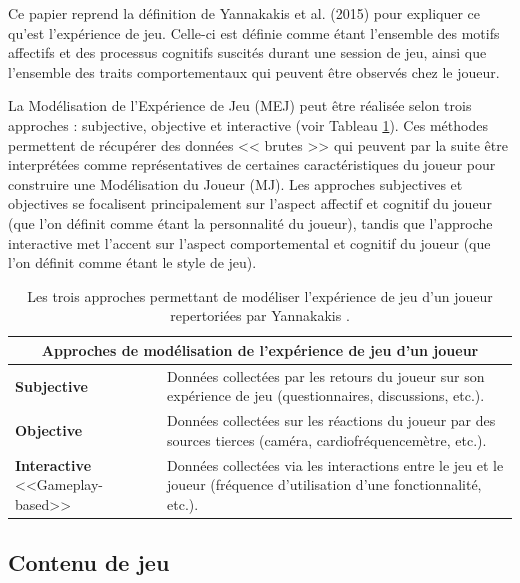 \documentclass[a4paper,11pt]{article}
\begin{document}
        Ce papier reprend la définition de Yannakakis et al. (2015) \cite{Yannakakis} pour expliquer ce qu'est l'expérience de jeu.
        Celle-ci est définie comme étant l'ensemble des motifs affectifs et des processus cognitifs suscités durant une session de jeu, ainsi que l'ensemble des traits comportementaux qui peuvent être observés chez le joueur.

        La Modélisation de l'Expérience de Jeu (MEJ) peut être réalisée selon trois approches : subjective, objective et interactive (voir Tableau \ref{table:pems}).
        Ces méthodes permettent de récupérer des données << brutes >> qui peuvent par la suite être interprétées comme représentatives de certaines caractéristiques du joueur pour construire une Modélisation du Joueur (MJ).
        Les approches subjectives et objectives se focalisent principalement sur l'aspect affectif et cognitif du joueur (que l'on définit comme étant la personnalité du joueur), tandis que l'approche interactive met l'accent sur l'aspect comportemental et cognitif du joueur (que l'on définit comme étant le style de jeu).
      
        \begin{table}
          \begin{tabularx}{\linewidth}{|p{2.2cm} X|}
            \hline
              \multicolumn{2}{|c|}{\textbf{Approches de modélisation de l'expérience de jeu d'un joueur}} \\
            \hline
              \textbf{Subjective} & Données collectées par les retours du joueur sur son expérience de jeu (questionnaires, discussions, etc.). \\
            \hline
              \textbf{Objective} & Données collectées sur les réactions du joueur par des sources tierces (caméra, cardiofréquencemètre, etc.). \\
            \hline
              \textbf{Interactive} \footnotesize<<Gameplay-based>> & Données collectées via les interactions entre le jeu et le joueur (fréquence d'utilisation d'une fonctionnalité, etc.). \\
            \hline
          \end{tabularx}
          \caption{Les trois approches permettant de modéliser l'expérience de jeu d'un joueur repertoriées par Yannakakis \cite{Yannakakis2}.}
          \label{table:pems}
        \end{table}

      \subsection{Contenu de jeu}\label{section:defs-content}
\end{document}
